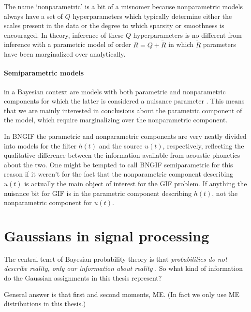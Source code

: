 \begin{chapterappendices}{5}
The name `nonparametric' is a bit of a misnomer because nonparametric models always have a set of $Q$ hyperparameters which typically determine either the scales present in the data or the degree to which sparsity or smoothness is encouraged.
In theory, inference of these $Q$ hyperparameters is no different from inference with a parametric model of order $R = Q + \tilde R$ in which $\tilde R$ parameters have been marginalized over analytically.


\paragraph{Semiparametric models}
in a Bayesian context are models with both parametric and nonparametric components for which the latter is considered a nuisance parameter \citep[][p.~368]{Ghosal2017}.
This means that we are mainly interested in conclusions about the parametric component of the model, which require marginalizing over the nonparametric component.

In BNGIF the parametric and nonparametric components are very neatly divided into models for the filter $h(t)$ and the source $u(t)$, respectively, reflecting the qualitative difference between the information available from acoustic phonetics about the two.
One might be tempted to call BNGIF semiparametric for this reason if it weren't for the fact that the nonparametric component describing $u(t)$ is actually the main object of interest for the GIF problem.
If anything the nuisance bit for GIF is in the parametric component describing $h(t)$, not the nonparametric component for $u(t)$.

\section{Gaussians in signal processing\label{app:gaussians-lti}}

The central tenet of Bayesian probability theory is that \emph{probabilities do not describe reality, only our information about reality} \citep{Jaynes1993}.
So what kind of information do the Gaussian assignments in this thesis represent?

General answer is that first and second moments, ME.
(In fact we only use ME distributions in this thesis.)


\end{chapterappendices}
